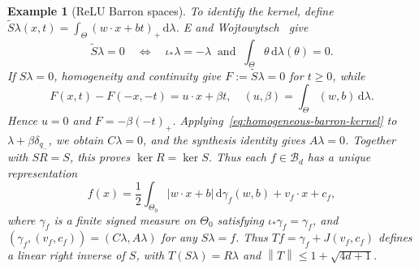 \documentclass[11pt,leqno]{amsart}
\theoremstyle{compact}
\numberwithin{equation}{section}
\theoremstyle{compactremark}
\newtheorem{example}[theorem]{Example}
\theoremstyle{compact}
\newcommand{\1}{\mathbbm{1}}
\newcommand{\rmd}{\mathrm{d}}
\newcommand{\norm}[1]{\left\|#1\right\|}
\newcommand{\abs}[1]{\left|#1\right|}
\begin{document}
\begin{example}[ReLU Barron spaces]
To identify the kernel, define $\widetilde S\lambda(x,t)=\int_\Theta(w\cdot x+bt)_+\,\rmd\lambda$. E and Wojtowytsch~\cite[Remark~4.6]{EWojtowytsch2022} give
\begin{equation}\label{eq:homogeneous-barron-kernel}
\widetilde S\lambda=0\quad\Longleftrightarrow\quad
\iota_*\lambda=-\lambda\ \text{ and }\ \int_\Theta\theta\,\rmd\lambda(\theta)=0.
\end{equation}
If $S\lambda=0$, homogeneity and continuity give $F:=\widetilde S\lambda=0$ for $t\geq0$, while
\[
F(x,t)-F(-x,-t)=u\cdot x+\beta t,\quad (u,\beta)=\int_\Theta(w,b)\,\rmd\lambda.
\]
Hence $u=0$ and $F=-\beta(-t)_+$. Applying~\eqref{eq:homogeneous-barron-kernel} to $\lambda+\beta\delta_{q_-}$, we obtain $C\lambda=0$, and the synthesis identity gives $A\lambda=0$. Together with $SR=S$, this proves $\ker R=\ker S$. Thus each $f\in\mathcal B_d$ has a unique representation
\[
f(x)=\frac{1}{2}\int_{\Theta_0}\abs{w\cdot x+b}\,\rmd\gamma_f(w,b)+v_f\cdot x+c_f,
\]
where $\gamma_f$ is a finite signed measure on $\Theta_0$ satisfying $\iota_*\gamma_f=\gamma_f$, and $(\gamma_f,(v_f,c_f))=(C\lambda,A\lambda)$ for any $S\lambda=f$. Thus $Tf=\gamma_f+J(v_f,c_f)$ defines a linear right inverse of $S$, with $T(S\lambda)=R\lambda$ and $\norm{T}\leq1+\sqrt{4d+1}$.


\end{example}
\end{document}
